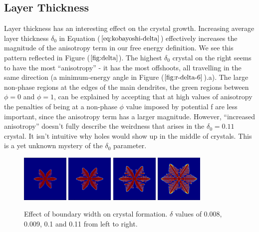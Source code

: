 \documentclass[10pt]{article} %
\begin{document}
\subsection{Layer Thickness}
Layer thickness has an interesting effect on the crystal growth. Increasing average layer thickness $\delta_0$ in Equation ($\ref{eq:kobayoshi-delta}$) effectively increases the magnitude of the anisotropy term in our free energy definition. We see this pattern reflected in Figure ($\ref{fig:delta}$). The highest $\delta_0$ crystal on the right seems to have the most ``anisotropy'' - it has the most offshoots, all travelling in the same direction (a minimum-energy angle in Figure ($\ref{fig:r-delta-6}$).a). The large non-phase regions at the edges of the main dendrites, the green regions between $\phi=0$ and $\phi=1$, can be explained by accepting that at high values of anisotropy the penalties of being at a non-phase $\phi$ value imposed by potential f are less important, since the anisotropy term has a larger magnitude. However, ``increased anisotropy'' doesn't fully describe the weirdness that arises in the $\delta_0 = 0.11$ crystal. It isn't intuitive why holes would show up in the middle of crystals. This is a yet unknown mystery of the $\delta_0$ parameter.\\

\begin{figure}[h!]
  \centering
  \includegraphics[width=0.2\textwidth]{../d-0.008-5.png}
  \includegraphics[width=0.2\textwidth]{../d-0.09-5.png}
  \includegraphics[width=0.2\textwidth]{../d-0.1-5.png}
  \includegraphics[width=0.2\textwidth]{../d-0.11-5.png}
  \caption{Effect of boundary width on crystal formation. $\delta$ values of 0.008, 0.009, 0.1 and 0.11 from left to right.}
  \label{fig:delta}
\end{figure}
\end{document}
